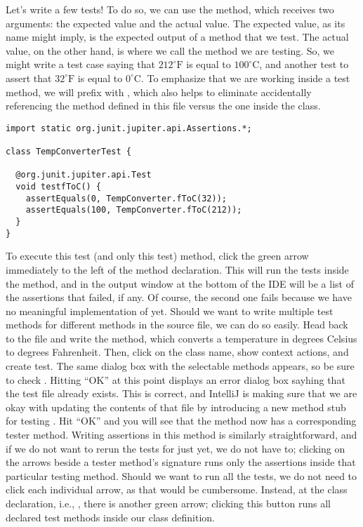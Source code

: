   Let's write a few tests! 
  To do so, we can use the  method, which receives two arguments: the expected value and the actual value. 
  The expected value, as its name might imply, is the expected output of a method that we test. 
  The actual value, on the other hand, is where we call the method we are testing. 
  So, we might write a test case saying that $212^{\circ}\text{F}$ is equal to $100^{\circ}\text{C}$, and another test to assert that $32^{\circ}\text{F}$ is equal to $0^{\circ}\text{C}$. 
  To emphasize that we are working inside a test method, we will prefix  with , which also helps to eliminate accidentally referencing the  method defined in this file versus the one inside the  class.

\begin{lstlisting}[language=MyJava]
import static org.junit.jupiter.api.Assertions.*;

class TempConverterTest {

  @org.junit.jupiter.api.Test
  void testfToC() {
    assertEquals(0, TempConverter.fToC(32));
    assertEquals(100, TempConverter.fToC(212));
  }
}
\end{lstlisting}

To execute this test (and only this test) method, click the green arrow immediately to the left of the method declaration. 
This will run the tests inside the method, and in the output window at the bottom of the IDE will be a list of the assertions that failed, if any. 
Of course, the second one fails because we have no meaningful implementation of  yet. 
Should we want to write multiple test methods for different methods in the source file, we can do so easily. 
Head back to the  file and write the  method, which converts a temperature in degrees Celsius to degrees Fahrenheit. 
Then, click on the class name, show context actions, and create test. 
The same dialog box with the selectable methods appears, so be sure to check . 
Hitting ``OK'' at this point displays an error dialog box sayhing that the test file already exists. 
This is correct, and IntelliJ is making sure that we are okay with updating the contents of that file by introducing a new method stub for testing . 
Hit ``OK'' and you will see that the  method now has a corresponding tester method. 
Writing assertions in this method is similarly straightforward, and if we do not want to rerun the tests for  just yet, we do not have to; clicking on the arrows beside a tester method's signature runs only the assertions inside that particular testing method. 
Should we want to run all the tests, we do not need to click each individual arrow, as that would be cumbersome. 
Instead, at the class declaration, i.e., , there is another green arrow; clicking this button runs all declared test methods inside our class definition.

